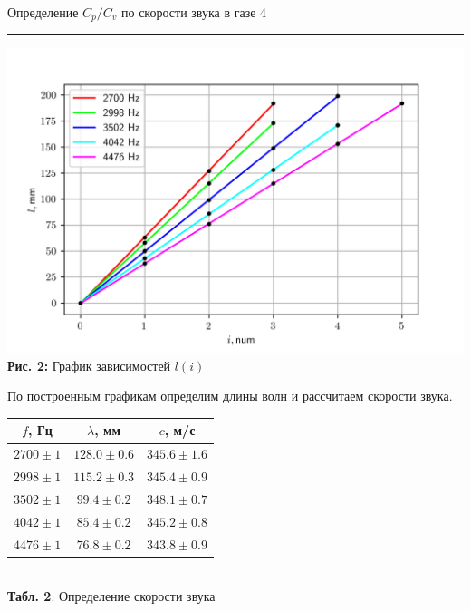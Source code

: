 \documentclass[12pt,a4paper]{scrartcl}
\begin{document}
	\newpage 
	
	
	\begin{flushleft}
		\footnotesize{Определение $C_p /C_v$ по скорости звука в газе} \hspace{\fill} \footnotesize{4}
		\\[-0.3cm]\noindent\rule{\textwidth}{0.3pt}
	\end{flushleft}
	
	\begin{center}
		\includegraphics[scale=0.73]{PIC_2.png}
		\\\textbf{Рис. 2:} График зависимостей $l(i)$
	\end{center}

	По построенным графикам определим длины волн и рассчитаем скорости звука.
	
	\begin{center}
		\begin{tabular}{|c|c|c|}
			\hline
			$f$, Гц & $\lambda$, мм & $c$, м/с
			\\\hline
			$2700 \pm 1$ & $128.0 \pm 0.6$ & $345.6 \pm 1.6$
			\\\hline
			$2998 \pm 1$ & $115.2 \pm 0.3$ & $345.4 \pm 0.9$
			\\\hline
			$3502 \pm 1$ & $99.4 \pm 0.2$ & $348.1 \pm 0.7$
			\\\hline
			$4042 \pm 1$ & $85.4 \pm 0.2$ & $345.2 \pm 0.8$
			\\\hline
			$4476 \pm 1$ & $76.8 \pm 0.2$ & $343.8 \pm 0.9$
			\\\hline
		\end{tabular}
		\\\textbf{Табл. 2}: Определение скорости звука
	\end{center}
\end{document}
